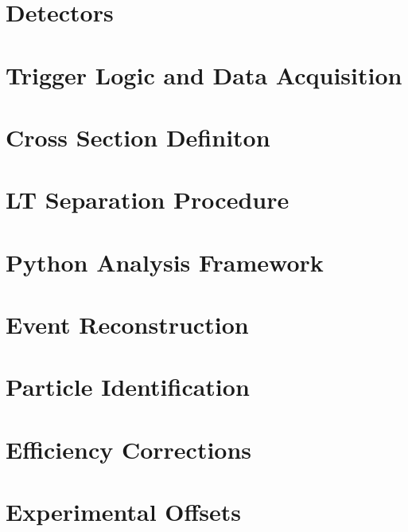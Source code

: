 \documentclass[
]{report}
\begin{document}
\hypertarget{Section-4.6}{%
\section{Detectors}\label{Section-4.6}}

\hypertarget{Section-4.7}{%
\section{Trigger Logic and Data Acquisition}\label{Section-4.7}}

\label{Chapter-5}

\hypertarget{Section-5.1}{%
\section{Cross Section Definiton}\label{Section-5.1}}

\hypertarget{Section-5.2}{%
\section{LT Separation Procedure}\label{Section-5.2}}

\hypertarget{Section-5.3}{%
\section{Python Analysis Framework}\label{Section-5.3}}

\hypertarget{Section-5.4}{%
\section{Event Reconstruction}\label{Section-5.4}}

\hypertarget{Section-5.5}{%
\section{Particle Identification}\label{Section-5.5}}

\hypertarget{Section-5.6}{%
\section{Efficiency Corrections}\label{Section-5.6}}

\hypertarget{Section-5.7}{%
\section{Experimental Offsets}\label{Section-5.7}}
\end{document}
